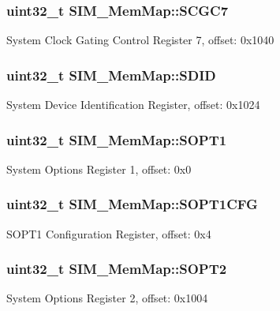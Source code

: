 \subsubsection[{S\+C\+G\+C7}]{\setlength{\rightskip}{0pt plus 5cm}uint32\+\_\+t S\+I\+M\+\_\+\+Mem\+Map\+::\+S\+C\+G\+C7}\label{struct_s_i_m___mem_map_aa35362a8c756eedb82b8cf00f98c43da}
System Clock Gating Control Register 7, offset\+: 0x1040 \hypertarget{struct_s_i_m___mem_map_a536b8d3e185149c51e88387350e20fb3}{}
\subsubsection[{S\+D\+I\+D}]{\setlength{\rightskip}{0pt plus 5cm}uint32\+\_\+t S\+I\+M\+\_\+\+Mem\+Map\+::\+S\+D\+I\+D}\label{struct_s_i_m___mem_map_a536b8d3e185149c51e88387350e20fb3}
System Device Identification Register, offset\+: 0x1024 \hypertarget{struct_s_i_m___mem_map_a1152a6ef88c78e762df97badf10b5050}{}
\subsubsection[{S\+O\+P\+T1}]{\setlength{\rightskip}{0pt plus 5cm}uint32\+\_\+t S\+I\+M\+\_\+\+Mem\+Map\+::\+S\+O\+P\+T1}\label{struct_s_i_m___mem_map_a1152a6ef88c78e762df97badf10b5050}
System Options Register 1, offset\+: 0x0 \hypertarget{struct_s_i_m___mem_map_a9b6ea6819e80eeaa90754b6e91fcc808}{}
\subsubsection[{S\+O\+P\+T1\+C\+F\+G}]{\setlength{\rightskip}{0pt plus 5cm}uint32\+\_\+t S\+I\+M\+\_\+\+Mem\+Map\+::\+S\+O\+P\+T1\+C\+F\+G}\label{struct_s_i_m___mem_map_a9b6ea6819e80eeaa90754b6e91fcc808}
S\+O\+P\+T1 Configuration Register, offset\+: 0x4 \hypertarget{struct_s_i_m___mem_map_ae4c4bf827aeca9c2de082cdfafdea3d1}{}
\subsubsection[{S\+O\+P\+T2}]{\setlength{\rightskip}{0pt plus 5cm}uint32\+\_\+t S\+I\+M\+\_\+\+Mem\+Map\+::\+S\+O\+P\+T2}\label{struct_s_i_m___mem_map_ae4c4bf827aeca9c2de082cdfafdea3d1}
System Options Register 2, offset\+: 0x1004 \hypertarget{struct_s_i_m___mem_map_adf28cda65cea7072379ec6064d0d93cc}{}
